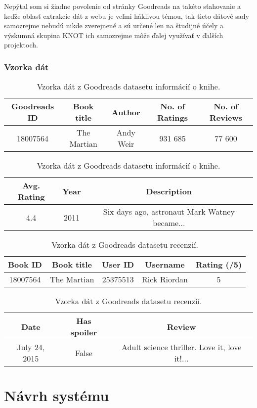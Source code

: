Nepýtal som si žiadne povolenie od stránky Goodreads na takéto sťahovanie a keďže oblasť extrakcie dát z webu je veľmi háklivou témou, tak tieto dátové sady samozrejme nebudú nikde zverejnené a sú určené len na študijné účely a výskumná skupina KNOT ich samozrejme môže ďalej využívať v ďalších projektoch.

\subsection*{Vzorka dát}

\begin{table}[hbt]
\centering
\caption{Vzorka dát z Goodreads datasetu informácií o knihe.}
\label{bookinfo}
\begin{tabular}{|c|c|c|c|c|}
\hline
Goodreads ID & Book title & Author & No. of Ratings & No. of Reviews  \\
\hline
18007564 & The Martian & Andy Weir & 931 685 & 77 600\\ 
\hline
\end{tabular}
\begin{tabular}{|c|c|c|}
\hline
Avg. Rating & Year & Description \\
\hline
4.4  & 2011 & Six days ago, astronaut Mark Watney became... \\ 
\hline
\end{tabular}
\end{table}

\begin{table}[hbt]
\centering
\caption{Vzorka dát z Goodreads datasetu recenzií.}
\label{reviewinfo}
\begin{tabular}{|c|c|c|c|c|}
\hline
Book ID & Book title & User ID  & Username & Rating (/5) \\
\hline
18007564 & The Martian & 25375513 & Rick Riordan & 5\\ 
\hline
\end{tabular}
\begin{tabular}{|c|c|c|}
\hline
Date & Has spoiler & Review \\
\hline
July 24, 2015  & False & Adult science thriller.  Love it, love it!...\\ 
\hline
\end{tabular}
\end{table}


\chapter{Návrh systému}
\label{navrh}

